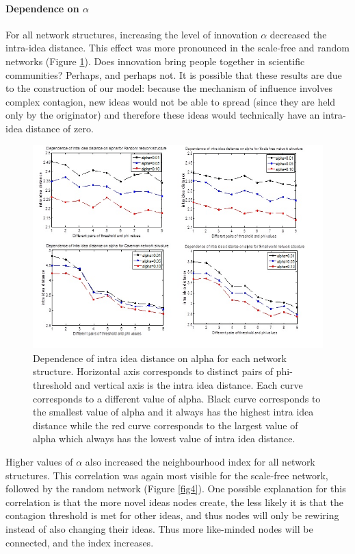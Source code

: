 \documentclass{beamer}
\begin{document}
\begin{frame}
\paragraph{Dependence on $\alpha$}
For all network structures, increasing the level of innovation $\alpha$ decreased the intra-idea distance. This effect was more pronounced in the scale-free and random networks (Figure \ref{fig3}). Does innovation bring people together in scientific communities? Perhaps, and perhaps not. It is possible that these results are due to the construction of our model: because the mechanism of influence involves complex contagion, new ideas would not be able to spread (since they are held only by the originator) and therefore these ideas would technically have an intra-idea distance of zero.

\begin{figure}
[htp]
\begin{center}
\includegraphics{Fig3}
\end{center}
\caption{Dependence of intra idea distance on alpha for each network structure. Horizontal axis corresponds to distinct pairs of phi-threshold and vertical axis is the intra idea distance. Each curve corresponds to a different value of alpha. Black curve corresponds to the smallest value of alpha and it always has the highest intra idea distance while the red curve corresponds to the largest value of alpha which always has the lowest value of intra idea distance.}
\label {fig3}
\end{figure}

Higher values of $\alpha$ also increased the neighbourhood index for all network structures. This correlation was again most visible for the scale-free network, followed by the random network (Figure \ref{fig4}). One possible explanation for this correlation is that the more novel ideas nodes create, the less likely it is that the contagion threshold is met for other ideas, and thus nodes will only be rewiring instead of also changing their ideas. Thus more like-minded nodes will be connected, and the index increases. 


\end{frame}
\end{document}
